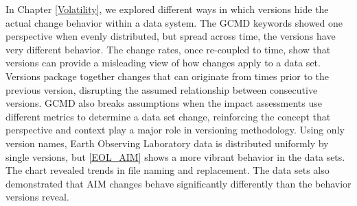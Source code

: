 In Chapter \ref{Volatility}, we explored different ways in which versions hide the actual change behavior within a data system.
The GCMD keywords showed one perspective when evenly distributed, but spread across time, the versions have very different behavior.
The change rates, once re-coupled to time, show that versions can provide a misleading view of how changes apply to a data set.
Versions package together changes that can originate from times prior to the previous version, disrupting the assumed relationship between consecutive versions.
GCMD also breaks assumptions when the impact assessments use different metrics to determine a data set change, reinforcing the concept that perspective and context play a major role in versioning methodology.
Using only version names, Earth Observing Laboratory data is distributed uniformly by single versions, but \ref{EOL_AIM} shows a more vibrant behavior in the data sets.
The chart revealed trends in file naming and replacement.
The data sets also demonstrated that AIM changes behave significantly differently than the behavior versions reveal.